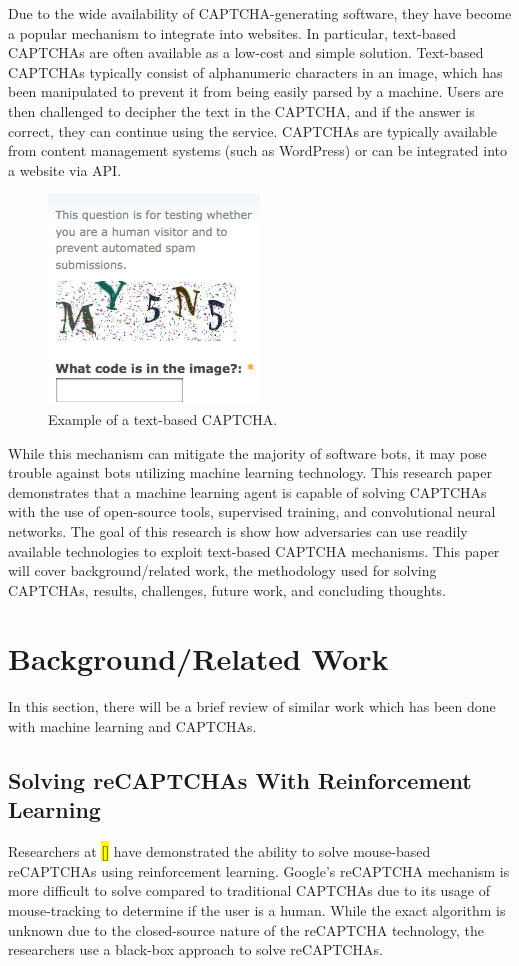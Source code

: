 \documentclass[11pt,conference]{IEEEtran}
\begin{document}
Due to the wide availability of CAPTCHA-generating software, they have become a popular
mechanism to integrate into websites. In particular, text-based CAPTCHAs are
often available as a low-cost and simple solution. Text-based CAPTCHAs
typically consist of alphanumeric characters in an image, which has been
manipulated to prevent it from being easily parsed by a machine. Users are then
challenged to decipher the text in the CAPTCHA, and if the answer is correct,
they can continue using the service. CAPTCHAs are typically available from
content management systems (such as WordPress) or can be integrated into a
website via API.

\begin{figure}[htbp]
	\centerline{\includegraphics[scale=0.7]{images/alphanumeric-captcha.png}}
	\caption{Example of a text-based CAPTCHA.}
	\label{figure}
\end{figure}

While this mechanism can mitigate the majority of software bots, it may pose
trouble against bots utilizing machine learning technology. This research
paper demonstrates that a machine learning agent is capable of solving CAPTCHAs
with the use of open-source tools, supervised training, and convolutional
neural networks. The goal of this research is show how adversaries can use
readily available technologies to exploit text-based CAPTCHA mechanisms.
This paper will cover background/related work, the methodology  used for
solving CAPTCHAs, results, challenges, future work, and concluding thoughts.

\section{Background/Related Work}
In this section, there will be a brief review of similar work which has been
done with machine learning and CAPTCHAs.

\subsection{Solving reCAPTCHAs With Reinforcement Learning}
Researchers at \hl{[]} have demonstrated the ability to solve mouse-based reCAPTCHAs using
reinforcement learning. Google's reCAPTCHA mechanism is more difficult to solve
compared to traditional CAPTCHAs due to its usage of mouse-tracking to
determine if the user is a human. While the exact algorithm is unknown due to
the closed-source nature of the reCAPTCHA technology, the researchers use a
black-box approach to solve reCAPTCHAs.
\end{document}
